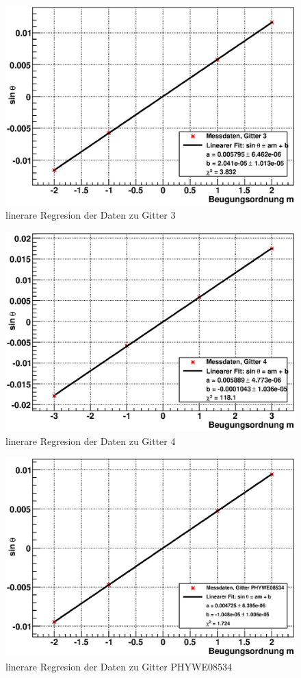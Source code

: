\documentclass[12pt]{article}
\begin{document}
\begin{figure}[H]  
\centering
\includegraphics[width=0.7\linewidth]{pictures/gitter3.eps}
\caption{linerare Regresion der Daten zu Gitter 3}
\end{figure}

\begin{figure}[H]  
\centering
\includegraphics[width=0.7\linewidth]{pictures/gitter4.eps}
\caption{linerare Regresion der Daten zu Gitter 4}
\end{figure}

\begin{figure}[H]  
\centering
\includegraphics[width=0.7\linewidth]{pictures/phywe08534.eps}
\caption{linerare Regresion der Daten zu Gitter PHYWE08534}
\end{figure}
\end{document}

